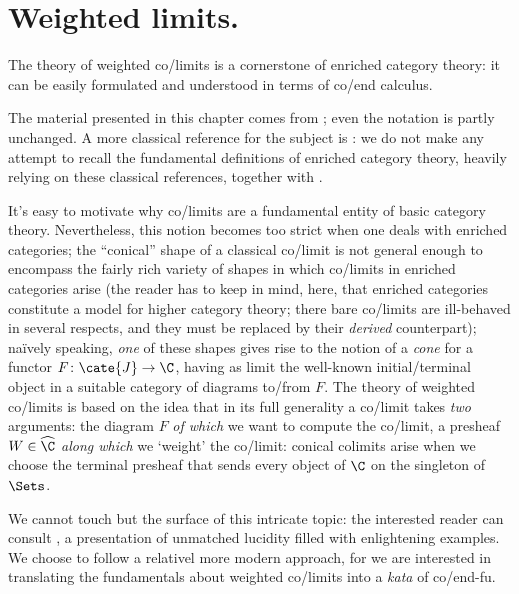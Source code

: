 \section{Weighted limits.}\label{section:weight}
The theory of weighted co/limits is a cornerstone of enriched category theory: it can be easily formulated and understood in terms of co/end calculus.

The material presented in this chapter comes from \cite[\textbf{II.7}]{riehl2014categorical}; even the notation is partly unchanged. A more classical reference for the subject is \cite{kelly1982basic,kelly1974review}: we do not make any attempt to recall the fundamental definitions of enriched category theory, heavily relying on these classical references, together with \cite{Bor2}.

It's easy to motivate why co/limits are a fundamental entity of basic category theory. Nevertheless, this notion becomes too strict when one deals with enriched categories; the ``conical'' shape of a classical co/limit is not general enough to encompass the fairly rich variety of shapes in which co/limits in enriched categories arise (the reader has to keep in mind, here, that enriched categories constitute a model for higher category theory; there bare co/limits are ill\hyp{}behaved in several respects, and they must be replaced by their \emph{derived} counterpart); na\"ively speaking, \emph{one} of these shapes gives rise to the notion of a \emph{cone} for a functor $F\colon \cate{J}\to \C$, having as limit the well-known initial/terminal object in a suitable category of diagrams to/from $F$. The theory of weighted co/limits is based on the idea that in its full generality a co/limit takes \emph{two} arguments: the diagram $F$ \emph{of which} we want to compute the co/limit, a presheaf $W \in\widehat{\C}$ \emph{along which} we `weight' the co/limit: conical colimits arise when we choose the terminal presheaf that sends every object of $\C$ on the singleton of $\Sets$.

We cannot touch but the surface of this intricate topic: the interested reader can consult \cite{2catlimits}, a presentation of unmatched lucidity filled with enlightening examples. We choose to follow a relativel more modern approach, for we are interested in translating the fundamentals about weighted co/limits into a \emph{kata} of co/end-fu. %

